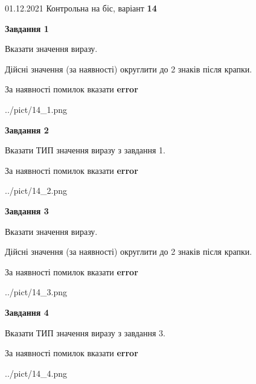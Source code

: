 \documentclass[11pt, ukrainian]{article}
\begin{document}
{01.12.2021 Контрольна на біс, варіант  \No \textbf { 14 }\par}
{
\begin {large}
{\begin {center}\textbf{Завдання 1}\end {center}}\par
Вказати значення виразу. \par
Дійсні значення (за наявності) округлити до 2 знаків після крапки. \par
За наявності помилок вказати \textbf{error}

\begin{center}
	{../pict/14_1.png}
\end{center}
\newpage

{\begin {center}\textbf{Завдання 2}\end {center}}\par
Вказати ТИП значення виразу з завдання 1. \par
За наявності помилок вказати \textbf{error}

\begin{center}
	{../pict/14_2.png}
\end{center}
\newpage

{\begin {center}\textbf{Завдання 3}\end {center}}\par
Вказати значення виразу. \par
Дійсні значення (за наявності) округлити до 2 знаків після крапки. \par
За наявності помилок вказати \textbf{error}

\begin{center}
	{../pict/14_3.png}
\end{center}
\newpage

{\begin {center}\textbf{Завдання 4}\end {center}}\par
Вказати ТИП значення виразу з завдання 3. \par
За наявності помилок вказати \textbf{error}

\begin{center}
	{../pict/14_4.png}
\end{center}
\newpage


\end{large}}
\end{document}
